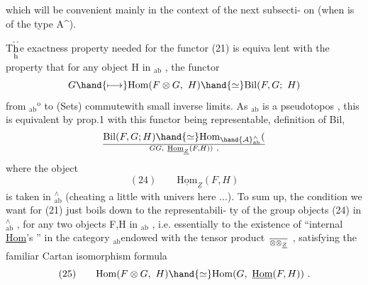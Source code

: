 
which will be  convenient mainly in the context of the next subsecti-%
on (when  is of the type A\^{}).

T\(\overset{\text{\tiny -\,-}}{\underset{\text{h}}{\text{h}}}\)e exactness property needed for the functor (21) is equiva lent
with the property that for any object H in $_{\mathrm{ab}}$ , the functor
\[ G \hand{\longmapsto} \mathrm{Hom}(F\otimes G,\ H) \hand{\simeq} \mathrm{Bil}(F,G;\ H) \]
from $_{\mathrm{ab}}{}^{\mathrm{o}}$ to (Sets) commutewith small inverse limits. As $_{\mathrm{ab}}$ is a
pseudotopos , this is equivalent  by prop.1 with this functor being
representable,  definition of Bil,  
 \[ \mathrm{Bil}(F,G;H)\hand{\simeq} \mathrm{Hom}_{\hand{\mathcal{A}}^{\wedge}_{\mathrm{ab}}}(\over{G}{G},\ \underline{\mathrm{Hom}}_{\underline{Z}}(F,H)) \ , \]
where the object
\[ (24) \qquad \underline{\mathrm{Hom}}_{\underline{Z}}(F,H) \]
is taken in   $^{\wedge}_{\mathrm{ab}}$ (cheating a little with univers here ...). To sum
up, the condition we want for (21) just boils down to the representabili-%
ty of the  group objects (24) in $^{\wedge}_{\mathrm{ab}}$ , for any two objects F,H in $_{\mathrm{ab}}$ ,
i.e. essentially to the existence of ``internal \uline{Hom}'s '' in the category
$_{\mathrm{ab}}$\hand{(}endowed with the tensor product $\over{\otimes}{\otimes}_{\underline{Z}}$ \hand{)}, satisfying the familiar
Cartan isomorphism formula
\[ (25) \qquad \mathrm{Hom}(F\otimes G,\ H)\hand{\simeq} \mathrm{Hom}(G,\ \underline{\mathrm{Hom}}(F,H)) \ . \]

